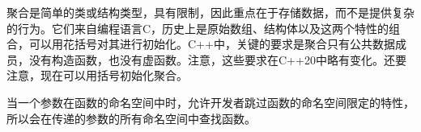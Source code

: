 


聚合是简单的类或结构类型，具有限制，因此重点在于存储数据，而不是提供复杂的行为。它们来自编程语言C，历史上是原始数组、结构体以及这两个特性的组合，可以用花括号对其进行初始化。C++中，关键的要求是聚合只有公共数据成员，没有构造函数，也没有虚函数。注意，这些要求在C++20中略有变化。还要注意，现在可以用括号初始化聚合。


当一个参数在函数的命名空间中时，允许开发者跳过函数的命名空间限定的特性，所以会在传递的参数的所有命名空间中查找函数。





